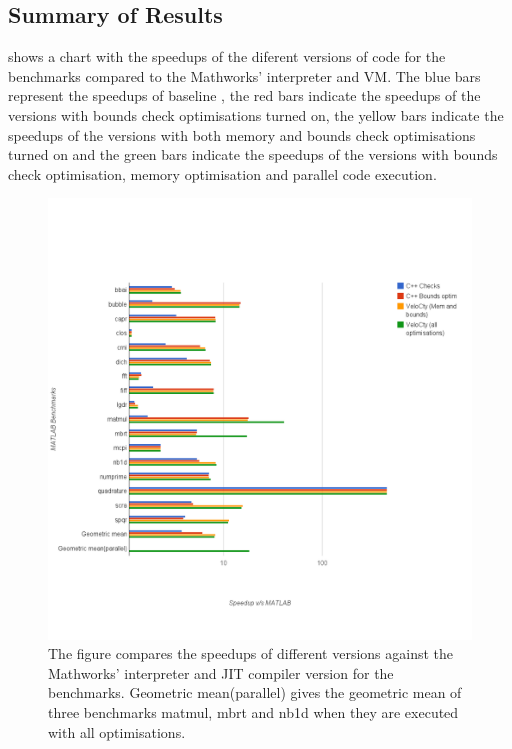 \subsection{Summary of \matlab Results}
 shows a chart with the speedups of the diferent versions of \velocty code for the \matlab benchmarks compared to the Mathworks' \matlab interpreter and VM. The blue bars represent the speedups of baseline \velocty, the red bars indicate the speedups of the \velocty versions with bounds check optimisations turned on, the yellow bars indicate the speedups of the \velocty versions with both memory and bounds check optimisations turned on and the green bars indicate the speedups of the \velocty versions with bounds check optimisation, memory optimisation and parallel code execution. 
\begin{figure}[htbp]
\centering
\includegraphics[scale=0.45]{Figures/final_mat.png}
\caption[Summary of \matlab benchmark results]{The figure compares the speedups of different \velocty versions against the Mathworks' interpreter and JIT compiler version for the \matlab benchmarks. Geometric mean(parallel) gives the geometric mean of three benchmarks matmul, mbrt and nb1d when they are executed with all optimisations.}
\label{fig:results_mat}
\end{figure}

